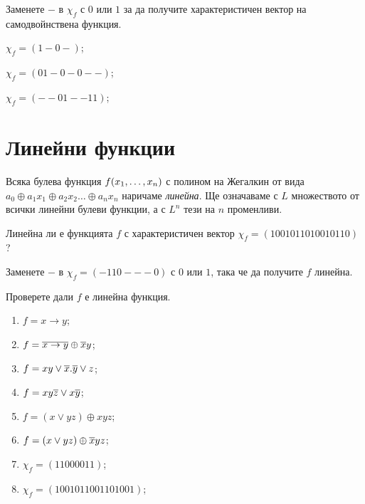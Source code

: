 \begin{problem}
  Заменете $-$ в $\chi_f$ с $0$ или $1$ за да получите характеристичен вектор на самодвойнствена функция.\\
  \begin{inparaenum}[a)]
  \item
    $\chi_f = (1-0-)$;
  \item
    $\chi_f = (01-0-0--)$;
  \item
    $\chi_f = (--01--11)$;
  \end{inparaenum}
\end{problem}

\section{Линейни функции}

Всяка булева функция $f(x_{1},\dots,x_{n})$ с полином на Жегалкин от вида 
$a_0\oplus a_1x_1 \oplus a_2x_2 \dots\oplus a_nx_n$ наричаме {\em линейна}.
Ще означаваме с $L$ множеството от всички линейни булеви функции, а с $L^n$ тези на $n$ променливи.

\begin{problem}
  Линейна ли е функцията $f$ с характеристичен вектор $\chi_f = (1001011010010110)$ ?
\end{problem}

\begin{problem}
  Заменете $-$ в $\chi_f = (-110---0)$ с $0$ или $1$, така че да получите $f$ линейна.
\end{problem}


\begin{problem}
  Проверете дали $f$ е линейна функция.
  \begin{enumerate}
  \item
    $f = x\rightarrow y$;
  \item
    $f = \overline{x\rightarrow y}\oplus \overline{x}y$;
  \item
    $f = xy\vee \overline{x}.\overline{y}\vee z$;
  \item
    $f = xy\overline{z}\vee x\overline{y}$;
  \item
    $f = (x\vee yz)\oplus xyz$;
  \item
    $f = (x\vee yz)\oplus \overline{x}yz$;
  \item
    $\chi_f = (1100 0011)$;
  \item
    $\chi_f = (1001 0110 0110 1001)$;
  \end{enumerate}
\end{problem}

